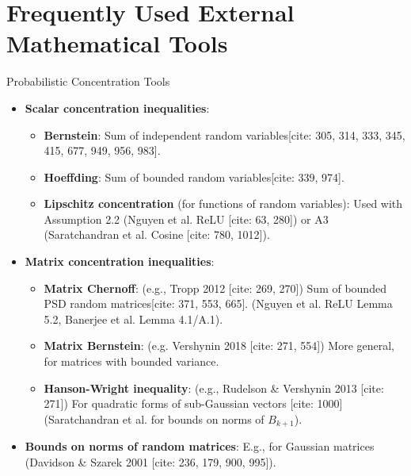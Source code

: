 \documentclass{beamer}
\theoremstyle{definition}
\theoremstyle{remark}
\begin{document}
\section{Frequently Used External Mathematical Tools}
\begin{frame}{Probabilistic Concentration Tools}
  \justify
  \begin{itemize}
    \item \textbf{Scalar concentration inequalities}:
    \begin{itemize}
      \item \textbf{Bernstein}: Sum of independent random variables[cite: 305, 314, 333, 345, 415, 677, 949, 956, 983].
      \item \textbf{Hoeffding}: Sum of bounded random variables[cite: 339, 974].
      \item \textbf{Lipschitz concentration} (for functions of random variables): Used with Assumption 2.2 (Nguyen et al. ReLU [cite: 63, 280]) or A3 (Saratchandran et al. Cosine [cite: 780, 1012]).
    \end{itemize}
    \pause
    \item \textbf{Matrix concentration inequalities}:
    \begin{itemize}
      \item \textbf{Matrix Chernoff}: (e.g., Tropp 2012 [cite: 269, 270]) Sum of bounded PSD random matrices[cite: 371, 553, 665]. (Nguyen et al. ReLU Lemma 5.2, Banerjee et al. Lemma 4.1/A.1).
      \item \textbf{Matrix Bernstein}: (e.g. Vershynin 2018 [cite: 271, 554]) More general, for matrices with bounded variance.
      \item \textbf{Hanson-Wright inequality}: (e.g., Rudelson & Vershynin 2013 [cite: 271]) For quadratic forms of sub-Gaussian vectors [cite: 1000] (Saratchandran et al. for bounds on norms of $B_{k+1}$).
    \end{itemize}
    \item \textbf{Bounds on norms of random matrices}: E.g., for Gaussian matrices (Davidson & Szarek 2001 [cite: 236, 179, 900, 995]).
  \end{itemize}
\end{frame}
\end{document}
